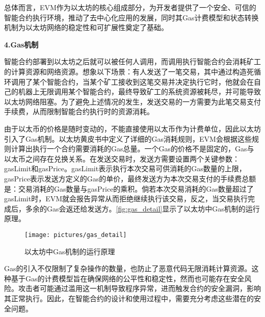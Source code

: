 
总体而言，EVM作为以太坊的核心组成部分，为开发者提供了一个安全、可信的智能合约执行环境，推动了去中心化应用的发展，同时其Gas计费模型和状态转换机制为以太坊网络的稳定性和可扩展性奠定了基础。   
    

\par\textbf{4.Gas机制}
    
智能合约部署到以太坊之后就可以被任何人调用，而调用执行智能合约会消耗矿工的计算资源和网络资源。想象以下场景：有人发送了一笔交易，其中通过构造死循环调用了某个智能合约，当某个矿工接收到这笔交易并决定执行它时，他就会在自己的机器上无限调用某个智能合约，最终导致矿工的系统资源被耗尽，并可能导致以太坊网络阻塞。为了避免上述情况的发生，发送交易的一方需要为此笔交易支付手续费，从而限制智能合约执行时的资源消耗。

由于以太币的价格是随时变动的，不能直接使用以太币作为计费单位，因此以太坊引入了Gas机制。以太坊黄皮书中定义了详细的Gas消耗规则，EVM会根据这些规则计算出执行一个合约需要消耗的Gas总量。一个Gas的价格不是固定的，Gas与以太币之间存在兑换关系\cite{tuliangqiong}。在发送交易时，发送方需要设置两个关键参数：gasLimit和gasPrice。gasLimit表示执行本次交易可供消耗的Gas数量的上限，gasPrice表示发送方定义的Gas的单价，最终发送方为本次交易支付的手续费总额是：交易消耗的Gas数量与gasPrice的乘积。倘若本次交易消耗的Gas数量超过了gasLimit时，EVM就会报告异常从而拒绝继续执行该交易，反之，当交易执行完成后，多余的Gas会返还给发送方。\autoref{fig:gas_detail}显示了以太坊中Gas机制的运行原理。

\begin{figure}[htbp]
    \centering
    \texttt{[image: pictures/gas\_detail]}
    \caption{\label{fig:gas_detail}以太坊中Gas机制的运行原理}
\end{figure}

Gas的引入不仅限制了复杂操作的数量，也防止了恶意代码无限消耗计算资源。这种基于Gas的计费模型旨在确保网络的公平性和稳定性，然而也可能存在安全风险。攻击者可能通过滥用这一机制导致程序异常，进而触发合约的安全漏洞，影响其正常执行。因此，在智能合约的设计和使用过程中，需要充分考虑这些潜在的安全问题。
